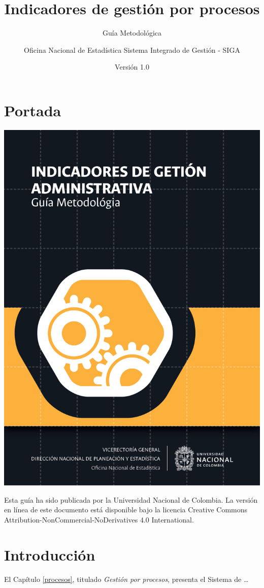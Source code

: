 \documentclass[
]{book}
\title{Indicadores de gestión por procesos}
\subtitle{Guía Metodológica}
\author{ Oficina Nacional de Estadística Sistema Integrado de Gestión - SIGA}
\date{Versión 1.0}
\begin{document}
\maketitle

{
\setcounter{tocdepth}{1}
\tableofcontents
}
\hypertarget{portada}{%
\chapter*{Portada}\label{portada}}

\begin{center}\includegraphics[width=0.75\linewidth]{Imagenes/Portada} \end{center}

Esta guía ha sido publicada por la Universidad Nacional de Colombia. La versión en línea de este documento está disponible bajo la licencia Creative Commons Attribution-NonCommercial-NoDerivatives 4.0 International.

\hypertarget{intro}{%
\chapter*{Introducción}\label{intro}}

El Capítulo \ref{procesos}, titulado \emph{Gestión por procesos}, presenta el Sistema de \ldots{}
\end{document}
